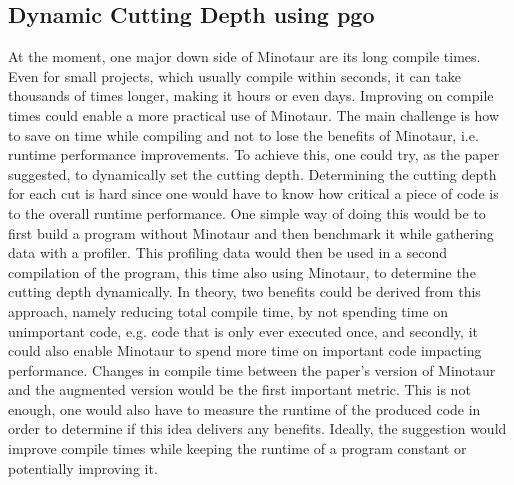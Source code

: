 	\subsection{Dynamic Cutting Depth using \gls*{pgo}}
	At the moment, one major down side of Minotaur are its long compile times.
	Even for small projects, which usually compile within seconds, it can take thousands of times longer, making it hours or even days.
	Improving on compile times could enable a more practical use of Minotaur.
	The main challenge is how to save on time while compiling and not to lose the benefits of Minotaur, i.e. runtime performance improvements.
	To achieve this, one could try, as the paper suggested, to dynamically set the cutting depth.
	Determining the cutting depth for each cut is hard since one would have to know how critical a piece of code is to the overall runtime performance.
	One simple way of doing this would be to first build a program without Minotaur and then benchmark it while gathering data with a profiler.
	This profiling data would then be used in a second compilation of the program, this time also using Minotaur, to determine the cutting depth dynamically.
	In theory, two benefits could be derived from this approach, namely reducing total compile time, by not spending time on unimportant code, e.g. code that is only ever executed once, and secondly, it could also enable Minotaur to spend more time on important code impacting performance.
	Changes in compile time between the paper's version of Minotaur and the augmented version would be the first important metric.
	This is not enough, one would also have to measure the runtime of the produced code in order to determine if this idea delivers any benefits.
	Ideally, the suggestion would improve compile times while keeping the runtime of a program constant or potentially improving it.

